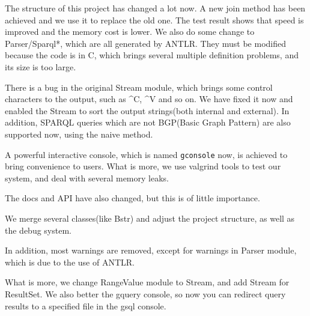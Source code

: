 \documentclass[titlepage, a4paper, 12pt]{article}
\begin{document}
\clearpage



The structure of this project has changed a lot now. A new join method
has been achieved and we use it to replace the old one. The test result
shows that speed is improved and the memory cost is lower. We also do
some change to Parser/Sparql*, which are all generated by ANTLR. They
must be modified because the code is in C, which brings several multiple
definition problems, and its size is too large.

There is a bug in the original Stream module, which brings some control
characters to the output, such as \^{}C, \^{}V and so on. We have fixed
it now and enabled the Stream to sort the output strings(both internal
and external). In addition, SPARQL queries which are not BGP(Basic Graph
Pattern) are also supported now, using the naive method.

A powerful interactive console, which is named \texttt{gconsole} now, is
achieved to bring convenience to users. What is more, we use valgrind
tools to test our system, and deal with several memory leaks.

The docs and API have also changed, but this is of little importance.


We merge several classes(like Bstr) and adjust the project structure, as
well as the debug system.

In addition, most warnings are removed, except for warnings in Parser
module, which is due to the use of ANTLR.

What is more, we change RangeValue module to Stream, and add Stream for
ResultSet. We also better the gquery console, so now you can redirect
query results to a specified file in the gsql console.
\end{document}
